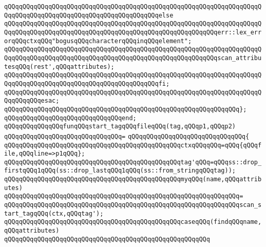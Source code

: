 \newline
\verb|qQQqqQQqqQQqqQQqqQQqqQQqqQQqqQQqqQQqqQQqqQQqqQQqqQQqqQQqqQQqqQQqqQQqqQQqqQQqqQQqqQQqqQQqqQQqqQQqqQQqqQQqqQQqqQQqelse|\newline
\verb|qQQqqQQqqQQqqQQqqQQqqQQqqQQqqQQqqQQqqQQqqQQqqQQqqQQqqQQqqQQqqQQqqQQqqQQqqQQqqQQqqQQqqQQqqQQqqQQqqQQqqQQqqQQqqQQqqQQqqQQqqQQqqQQqerr::lex_errorqQQqctxqQQq"bogusqQQqcharacterqQQqinqQQqelement";|\newline
\verb|qQQqqQQqqQQqqQQqqQQqqQQqqQQqqQQqqQQqqQQqqQQqqQQqqQQqqQQqqQQqqQQqqQQqqQQqqQQqqQQqqQQqqQQqqQQqqQQqqQQqqQQqqQQqqQQqqQQqqQQqqQQqqQQqscan_attributesqQQq(rest',qQQqattributes);|\newline
\verb|qQQqqQQqqQQqqQQqqQQqqQQqqQQqqQQqqQQqqQQqqQQqqQQqqQQqqQQqqQQqqQQqqQQqqQQqqQQqqQQqqQQqqQQqqQQqqQQqqQQqqQQqqQQqqQQqfi;|\newline
\verb|qQQqqQQqqQQqqQQqqQQqqQQqqQQqqQQqqQQqqQQqqQQqqQQqqQQqqQQqqQQqqQQqqQQqqQQqqQQqqQQqesac;|\newline
\verb|qQQqqQQqqQQqqQQqqQQqqQQqqQQqqQQqqQQqqQQqqQQqqQQqqQQqqQQqqQQqqQQq};|\newline
\verb|qQQqqQQqqQQqqQQqqQQqqQQqqQQqqQQqend;|\newline
\newline
\verb|qQQqqQQqqQQqqQQqfunqQQqstart_tagqQQqfileqQQq(tag,qQQqp1,qQQqp2)|\newline
\verb|qQQqqQQqqQQqqQQqqQQqqQQqqQQqqQQq=|\newline
\verb|qQQqqQQqqQQqqQQqqQQqqQQqqQQqqQQq{|\newline
\verb|qQQqqQQqqQQqqQQqqQQqqQQqqQQqqQQqqQQqqQQqqQQqqQQqctxqQQqqQQq=qQQq{qQQqfile,qQQqline=>p1qQQq};|\newline
\verb|qQQqqQQqqQQqqQQqqQQqqQQqqQQqqQQqqQQqqQQqqQQqqQQqtag'qQQq=qQQqss::drop_firstqQQq1qQQq(ss::drop_lastqQQq1qQQq(ss::from_stringqQQqtag));|\newline
\newline
\verb|qQQqqQQqqQQqqQQqqQQqqQQqqQQqqQQqqQQqqQQqqQQqqQQqmyqQQq(name,qQQqattributes)|\newline
\verb|qQQqqQQqqQQqqQQqqQQqqQQqqQQqqQQqqQQqqQQqqQQqqQQqqQQqqQQqqQQqqQQq=|\newline
\verb|qQQqqQQqqQQqqQQqqQQqqQQqqQQqqQQqqQQqqQQqqQQqqQQqqQQqqQQqqQQqqQQqscan_start_tagqQQq(ctx,qQQqtag');|\newline
\newline
\verb|qQQqqQQqqQQqqQQqqQQqqQQqqQQqqQQqqQQqqQQqqQQqqQQqcaseqQQq(findqQQqname,qQQqattributes)|\newline
\verb|qQQqqQQqqQQqqQQqqQQqqQQqqQQqqQQqqQQqqQQqqQQqqQQqqQQqqQQq|\newline
